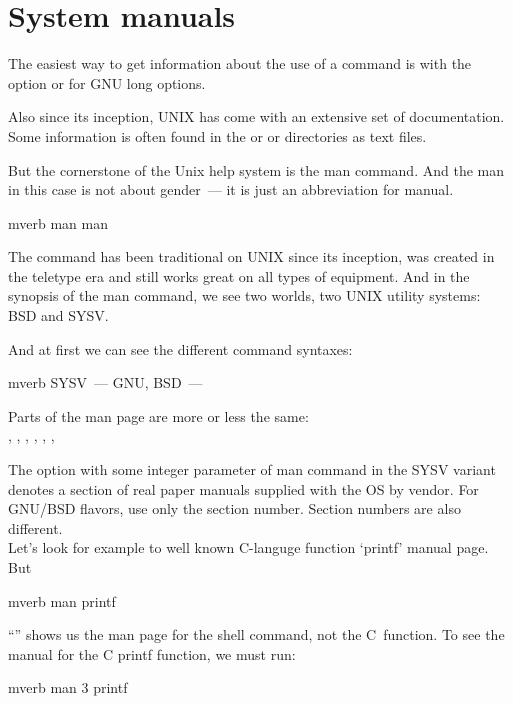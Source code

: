 \section*{System manuals}

The easiest way to get information about the use of a command is with
the  option or  for GNU long options.

Also since its inception, UNIX has come with an extensive set of
documentation. Some information is often found in the  or
 or  directories as text files.

But the cornerstone of the Unix help system is the man command. And the man
in this case is not about gender~--- it is just an abbreviation for manual.
\begin{code}{mverb}
man man
\end{code}
The  command has been traditional on UNIX since its inception,
was created in the teletype era and still works great on all types of equipment.
And in the synopsis of the man command, we see two worlds,
two UNIX utility systems: BSD and SYSV.

And at first we can see the different command syntaxes:
\begin{code}{mverb}
SYSV~--- 
GNU, BSD~--- 
\end{code}

Parts of the man page are more or less the same:\\
, , , ,
, , 

The  option with some integer parameter of man command
in the SYSV variant denotes a section of real paper manuals supplied with
the OS by vendor. For GNU/BSD flavors, use only the section number.
Section numbers are also different.\\

Let's look for example to well known C-languge function `printf' manual page.
But
\begin{code}{mverb}
man printf
\end{code}
``'' shows us the man page for the shell command, not
the C~function. To see the manual for the C printf function, we must run:
\begin{code}{mverb}
man 3 printf
\end{code}

